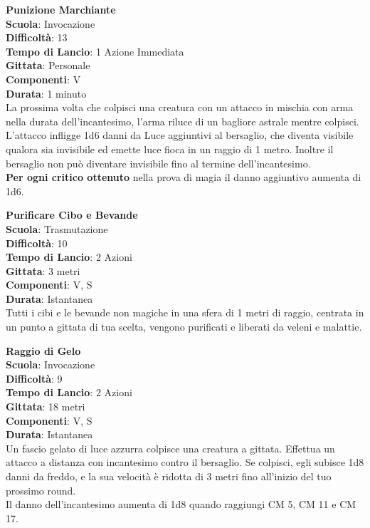 \begin{multicols}{2}
\medskip\textbf{Punizione Marchiante}\\
\textbf{Scuola}: Invocazione\\
\textbf{Difficoltà}:  13\\
\textbf{Tempo di Lancio}: 1 Azione Immediata\\
\textbf{Gittata}: Personale\\
\textbf{Componenti}: V\\
\textbf{Durata}: 1 minuto\\
La prossima volta che colpisci una creatura con un attacco in mischia con arma nella durata dell'incantesimo, l’arma riluce di un bagliore astrale mentre colpisci. L’attacco infligge 1d6 danni da Luce aggiuntivi al bersaglio, che diventa visibile qualora sia invisibile ed emette luce fioca in un raggio di 1 metro. Inoltre il bersaglio non può diventare invisibile fino al termine dell'incantesimo. \\
\textbf{Per ogni critico ottenuto} nella prova di magia il danno aggiuntivo aumenta di 1d6.

\medskip\textbf{Purificare Cibo e Bevande}\\
\textbf{Scuola}: Trasmutazione\\
\textbf{Difficoltà}:  10\\
\textbf{Tempo di Lancio}: 2 Azioni\\
\textbf{Gittata}: 3 metri\\
\textbf{Componenti}: V, S\\
\textbf{Durata}: Istantanea\\
Tutti i cibi e le bevande non magiche in una sfera di 1 metri di raggio, centrata in un punto a gittata di tua scelta, vengono purificati e liberati da veleni e malattie. 

\medskip\textbf{Raggio di Gelo}\\
\textbf{Scuola}: Invocazione\\
\textbf{Difficoltà}:  9\\
\textbf{Tempo di Lancio}: 2 Azioni\\
\textbf{Gittata}: 18 metri\\
\textbf{Componenti}: V, S\\
\textbf{Durata}: Istantanea\\
Un fascio gelato di luce azzurra colpisce una creatura a gittata. Effettua un attacco a distanza con incantesimo contro il bersaglio. Se colpisci, egli subisce 1d8 danni da freddo, e la sua velocità è ridotta di 3 metri fino all'inizio del tuo prossimo round. \\
Il danno dell'incantesimo aumenta di 1d8 quando raggiungi CM 5, CM 11 e CM 17.


\end{multicols}
